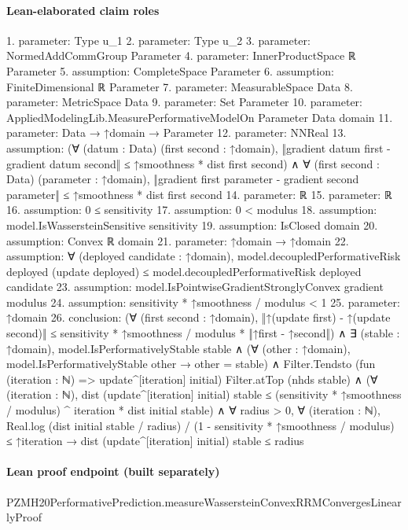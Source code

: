 \documentclass[10pt]{article}
\begin{document}
\paragraph{Lean-elaborated claim roles}\begin{ReviewVerbatim}
1. parameter: Type u_1
2. parameter: Type u_2
3. parameter: NormedAddCommGroup Parameter
4. parameter: InnerProductSpace ℝ Parameter
5. assumption: CompleteSpace Parameter
6. assumption: FiniteDimensional ℝ Parameter
7. parameter: MeasurableSpace Data
8. parameter: MetricSpace Data
9. parameter: Set Parameter
10. parameter: AppliedModelingLib.MeasurePerformativeModelOn Parameter Data domain
11. parameter: Data → ↑domain → Parameter
12. parameter: NNReal
13. assumption: (∀ (datum : Data) (first second : ↑domain),
    ‖gradient datum first - gradient datum second‖ ≤ ↑smoothness * dist first second) ∧
  ∀ (first second : Data) (parameter : ↑domain),
    ‖gradient first parameter - gradient second parameter‖ ≤ ↑smoothness * dist first second
14. parameter: ℝ
15. parameter: ℝ
16. assumption: 0 ≤ sensitivity
17. assumption: 0 < modulus
18. assumption: model.IsWassersteinSensitive sensitivity
19. assumption: IsClosed domain
20. assumption: Convex ℝ domain
21. parameter: ↑domain → ↑domain
22. assumption: ∀ (deployed candidate : ↑domain),
  model.decoupledPerformativeRisk deployed (update deployed) ≤ model.decoupledPerformativeRisk deployed candidate
23. assumption: model.IsPointwiseGradientStronglyConvex gradient modulus
24. assumption: sensitivity * ↑smoothness / modulus < 1
25. parameter: ↑domain
26. conclusion: (∀ (first second : ↑domain),
    ‖↑(update first) - ↑(update second)‖ ≤ sensitivity * ↑smoothness / modulus * ‖↑first - ↑second‖) ∧
  ∃ (stable : ↑domain),
    model.IsPerformativelyStable stable ∧
      (∀ (other : ↑domain), model.IsPerformativelyStable other → other = stable) ∧
        Filter.Tendsto (fun (iteration : ℕ) => update^[iteration] initial) Filter.atTop (nhds stable) ∧
          (∀ (iteration : ℕ),
              dist (update^[iteration] initial) stable ≤
                (sensitivity * ↑smoothness / modulus) ^ iteration * dist initial stable) ∧
            ∀ radius > 0,
              ∀ (iteration : ℕ),
                Real.log (dist initial stable / radius) / (1 - sensitivity * ↑smoothness / modulus) ≤ ↑iteration →
                  dist (update^[iteration] initial) stable ≤ radius
\end{ReviewVerbatim}

\paragraph{Lean proof endpoint (built separately)}\begin{ReviewVerbatim}
PZMH20PerformativePrediction.measureWassersteinConvexRRMConvergesLinearlyProof
\end{ReviewVerbatim}
\end{document}
